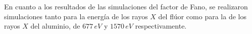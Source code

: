 
En cuanto a los resultados de las simulaciones del factor de Fano, se realizaron simulaciones tanto para la energía de los rayos $X$ del flúor como para la de los rayos $X$ del aluminio, de $677\,\si{eV}$ y $1570\,\si{eV}$ respectivamente.


